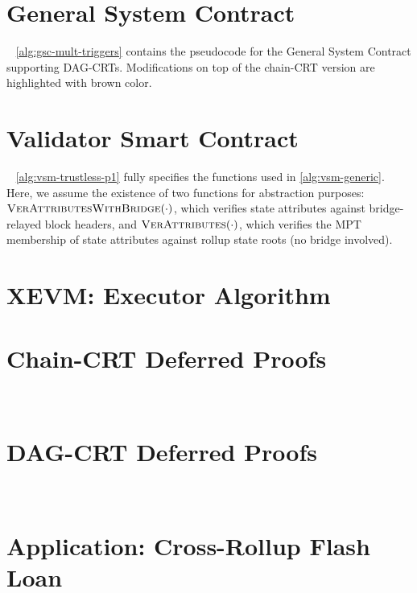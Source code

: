 
\section{General System Contract}~\label{apdx:gsc}
 \cref{alg:gsc-mult-triggers} contains the pseudocode for the General System Contract supporting DAG-CRTs. Modifications on top of the chain-CRT version are highlighted with \textcolor{dag}{brown color}.



\section{Validator Smart Contract}~\label{apdx:vsm}
\cref{alg:vsm-trustless-p1} fully specifies the functions used in \cref{alg:vsm-generic}. Here, we assume the existence of two functions for abstraction purposes: $\textproc{VerAttributesWithBridge}(\cdot)$, which verifies state attributes against bridge-relayed block headers, and $\textproc{VerAttributes}(\cdot)$, which verifies the MPT membership of state attributes against rollup state roots (no bridge involved).  




\section{XEVM: Executor Algorithm}




\section{Chain-CRT Deferred Proofs}~\label{apdx:chain-crt-proofs}



\section{DAG-CRT Deferred Proofs}~\label{apdx:dag-crt-proofs}




\newpage
\section{Application: Cross-Rollup Flash Loan}~\label{apdx:xfl}




\newpage


\newpage











